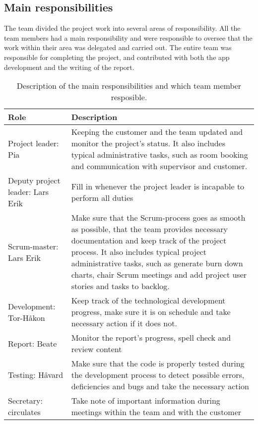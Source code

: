 \newpage
\subsection{Main responsibilities}

The team divided the project work into several areas of responsibility. All the team members had a main responsibility and were responsible to oversee that the work within their area was delegated and carried out. The entire team was responsible for completing the project, and contributed with both the app development and the writing of the report.


\begin{table}[H]
\centering
{}
\begin{tabular}{|l|p{9.7cm}|}
\hline
\textbf{Role} & \textbf{Description}\\\hline
Project leader: Pia & Keeping the customer and the team updated and monitor the project's status. It also includes typical administrative tasks, such as room booking and communication with supervisor and customer.\\\hline
Deputy project leader: Lars Erik & Fill in whenever the project leader is incapable to perform all duties\\\hline
Scrum-master: Lars Erik & Make sure that the Scrum-process goes as smooth as possible, that the team provides necessary documentation and keep track of the project process. It also includes typical project administrative tasks, such as generate burn down charts, chair Scrum meetings and add project user stories and tasks to backlog.\\\hline
Development: Tor-Håkon & Keep track of the technological development progress, make sure it is on schedule and take necessary action if it does not.\\\hline
Report: Beate & Monitor the report's progress, spell check and review content\\\hline
Testing: Håvard & Make sure that the code is properly tested during the development process to detect possible errors, deficiencies and bugs and take the necessary action \\\hline
Secretary: circulates & Take note of important information during meetings within the team and with the customer\\\hline
\end{tabular}
\caption{Description of the main responsibilities and which team member resposible.}
\label{tab:mainResponsibles}
\end{table}
